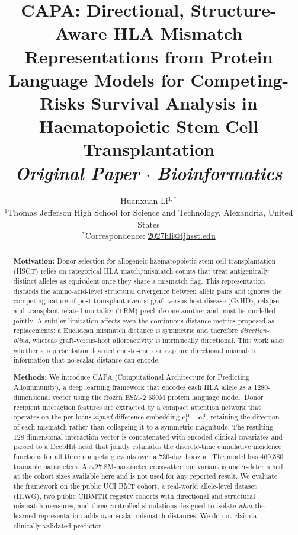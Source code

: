 \documentclass[11pt,a4paper]{article}
\title{\textbf{CAPA: Directional, Structure-Aware HLA Mismatch Representations
from Protein Language Models for Competing-Risks Survival Analysis in
Haematopoietic Stem Cell Transplantation}\\[6pt]
\normalsize\textit{Original Paper} \quad $\cdot$ \quad \textit{Bioinformatics}}
\author{Huanxuan Li$^{1,*}$\\[4pt]
\small $^1$Thomas Jefferson High School for Science and Technology, Alexandria, United States\\
\small $^*$Correspondence: \href{mailto:2027hli@tjhsst.edu}{2027hli@tjhsst.edu}}
\date{}
\begin{document}
\maketitle
\thispagestyle{fancy}

\begin{abstract}
\noindent\textbf{Motivation:}
Donor selection for allogeneic haematopoietic stem cell transplantation (HSCT)
relies on categorical HLA match/mismatch counts that treat antigenically
distinct alleles as equivalent once they share a mismatch flag.  This
representation discards the amino-acid-level structural divergence between
allele pairs and ignores the competing nature of post-transplant events:
graft-versus-host disease (GvHD), relapse, and transplant-related mortality
(TRM) preclude one another and must be modelled jointly.  A subtler limitation
affects even the continuous distance metrics proposed as replacements: a
Euclidean mismatch distance is symmetric and therefore \emph{direction-blind},
whereas graft-versus-host alloreactivity is intrinsically directional.  This
work asks whether a representation learned end-to-end can capture directional
mismatch information that no scalar distance can encode.

\medskip\noindent\textbf{Methods:}
We introduce CAPA (Computational Architecture for Predicting Alloimmunity), a
deep learning framework that encodes each HLA allele as a 1280-dimensional
vector using the frozen ESM-2 650M protein language model.  Donor--recipient
interaction features are extracted by a compact attention network that
operates on the per-locus \emph{signed} difference embedding
$\mathbf{e}^{\mathrm{D}}_l-\mathbf{e}^{\mathrm{R}}_l$, retaining the direction
of each mismatch rather than collapsing it to a symmetric magnitude.  The
resulting 128-dimensional interaction vector is concatenated with encoded
clinical covariates and passed to a DeepHit head that jointly estimates the
discrete-time cumulative incidence functions for all three competing events
over a 730-day horizon.  The model has 469{,}580 trainable parameters.  A
${\sim}27.8$M-parameter cross-attention variant is under-determined at the
cohort sizes available here and is not used for any reported result.  We
evaluate the
framework on the public UCI BMT cohort, a real-world allele-level dataset
(IHWG), two public CIBMTR registry cohorts with directional and structural
mismatch measures, and three controlled simulations designed to isolate \emph{what}
the learned representation adds over scalar mismatch distances.  We do not
claim a clinically validated predictor.


\end{abstract}
\end{document}
